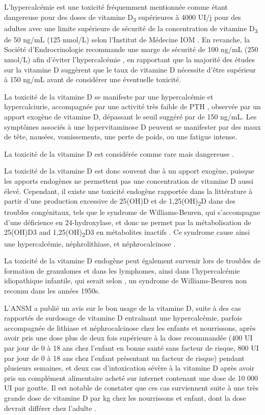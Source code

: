 \documentclass[
  a4paper,
  DIV=11,
  numbers=noendperiod,
  listof=totoc]{scrreprt}
\begin{document}
L'hypercalcémie est une toxicité fréquemment mentionnée comme étant
dangereuse pour des doses de vitamine D\textsubscript{3} supérieures à
4000 UI/j pour des adultes avec une limite supérieure de sécurité de la
concentration de vitamine D\textsubscript{3} de 50 ng/mL (125 nmol/L)
selon l'Institut de Médecine \acs{IOM} \autocite{IOM.2011,Holick.2011}.
En revanche, la Société d'Endrocrinologie recommande une marge de
sécurité de 100 ng/mL (250 nmol/L) afin d'éviter l'hypercalcémie
\autocite{Holick.2011}, en rapportant que la majorité des études sur la
vitamine D suggèrent que le taux de vitamine D nécessite d'être
supérieur à 150 ng/mL avant de considérer une éventuelle toxicité.

La toxicité de la vitamine D se manifeste par une hypercalcémie et
hypercalciurie, accompagnée par une activité très faible de PTH
\autocite{Marcinowska-Suchowierska.2018}, observée par un apport exogène
de vitamine D, dépassant le seuil suggéré par \textcite{Holick.2011} de
150 ng/mL. Les symptômes associés à une hypervitaminose D peuvent se
manifester par des maux de tête, nausées, vomissements, une perte de
poids, ou une fatigue intense.

La toxicité de la vitamine D est considérée comme rare mais dangereuse
\autocite{Marcinowska-Suchowierska.2018,Holick.2015}.

La toxicité de la vitamine D est donc souvent due à un apport exogène,
puisque les apports endogènes ne permettent pas une concentration de
vitamine D aussi élevé. Cependant, il existe une toxicité endogène
rapportée dans la littérature à partir d'une production excessive de
25(OH)D et de 1,25(OH)\textsubscript{2}D dans des troubles congénitaux,
tels que le syndrome de Williams-Beuren, qui s'accompagne d'une
déficience en 24-hydroxylase, et donc ne permet pas la métabolisation de
25(OH)D3 and 1,25(OH)\textsubscript{2}D3 en métabolites inactifs
\autocite{Marcinowska-Suchowierska.2018,Holick.2015}. Ce syndrome cause
ainsi une hypercalcémie, néphrolithiase, et néphrocalcinose
\autocite{Azer.2021}.

La toxicité de la vitamine D endogène peut également survenir lors de
troubles de formation de granulomes et dans les lymphomes, ainsi dans
l'hypercalcémie idiopathique infantile, qui serait selon
\textcite{Holick.2015}, un syndrome de Williams-Beuren non reconnu dans
les années 1950s.

L'ANSM a publié un avis sur le bon usage de la vitamine D, suite à des
cas rapportés de surdosage de vitamine D entraînant une hypercalcémie,
parfois accompagnée de lithiase et néphrocalcinose chez les enfants et
nourrissons, après avoir pris une dose plus de deux fois supérieure à la
dose recommandée (400 UI par jour de 0 à 18 ans chez l'enfant en bonne
santé sans facteur de risque, 800 UI par jour de 0 à 18 ans chez
l'enfant présentant un facteur de risque) pendant plusieurs semaines, et
deux cas d'intoxication sévère à la vitamine D après avoir pris un
complément alimentaire acheté sur internet contenant une dose de 10 000
UI par goutte. Il est notable de constater que ces cas surviennent suite
à une très grande dose de vitamine D par kg chez les nourrissons et
enfant, dont la dose devrait différer chez l'adulte
\autocite{ANSM.2021}.
\end{document}
